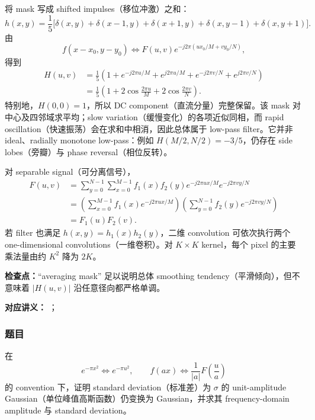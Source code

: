 \begin{checkedsolution}
将 mask 写成 shifted impulses（移位冲激）之和：
\[
  h(x,y)=\frac15\bigl[
  \delta(x,y)+\delta(x-1,y)+\delta(x+1,y)
  +\delta(x,y-1)+\delta(x,y+1)\bigr].
\]
由
\[
  f(x-x_0,y-y_0)
  \Longleftrightarrow
  F(u,v)e^{-j2\pi(ux_0/M+vy_0/N)},
\]
得到
\begin{align*}
  H(u,v)
  &=\frac15\left(1+e^{-j2\pi u/M}+e^{j2\pi u/M}
  +e^{-j2\pi v/N}+e^{j2\pi v/N}\right)\\
  &=\boxed{\frac15\left(1+2\cos\frac{2\pi u}{M}
  +2\cos\frac{2\pi v}{N}\right)}.
\end{align*}
特别地，$H(0,0)=1$，所以 DC component（直流分量）完整保留。该 mask 对中心及四邻域求平均；slow variation（缓慢变化）的各项近似同相，而 rapid oscillation（快速振荡）会在求和中相消，因此总体属于 low-pass filter。它并非 ideal、radially monotone low-pass：例如 $H(M/2,N/2)=-3/5$，仍存在 side lobes（旁瓣）与 phase reversal（相位反转）。

对 separable signal（可分离信号），
\begin{align*}
F(u,v)
&=\sum_{y=0}^{N-1}\sum_{x=0}^{M-1}
f_1(x)f_2(y)e^{-j2\pi ux/M}e^{-j2\pi vy/N}\\
&=\left(\sum_{x=0}^{M-1}f_1(x)e^{-j2\pi ux/M}\right)
\left(\sum_{y=0}^{N-1}f_2(y)e^{-j2\pi vy/N}\right)\\
&=\boxed{F_1(u)F_2(v)}.
\end{align*}
若 filter 也满足 $h(x,y)=h_1(x)h_2(y)$，二维 convolution 可依次执行两个 one-dimensional convolutions（一维卷积）。对 $K\times K$ kernel，每个 pixel 的主要乘法量由约 $K^2$ 降为 $2K$。
\end{checkedsolution}

\textbf{检查点：}``averaging mask'' 足以说明总体 smoothing tendency（平滑倾向），但不意味着 $|H(u,v)|$ 沿任意径向都严格单调。


\textbf{对应讲义：}
；

\subsubsection*{题目}

在
\[
  e^{-\pi x^2}\Longleftrightarrow e^{-\pi u^2},
  \qquad
  f(ax)\Longleftrightarrow \frac1{|a|}F\!\left(\frac ua\right)
\]
的 convention 下，证明 standard deviation（标准差）为 $\sigma$ 的 unit-amplitude Gaussian（单位峰值高斯函数）仍变换为 Gaussian，并求其 frequency-domain amplitude 与 standard deviation。

